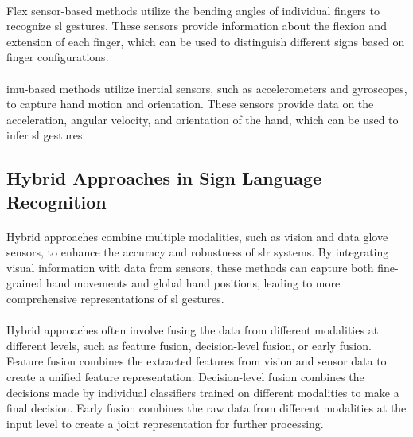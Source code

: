 \paragraph{}
Flex sensor-based methods utilize the bending angles of individual fingers to recognize \ac{sl} gestures. These sensors provide information about the flexion and extension of each finger, which can be used to distinguish different signs based on finger configurations.
\paragraph{}
\ac{imu}-based methods utilize inertial sensors, such as accelerometers and gyroscopes, to capture hand motion and orientation. These sensors provide data on the acceleration, angular velocity, and orientation of the hand, which can be used to infer \ac{sl} gestures.
\subsection{Hybrid Approaches in Sign Language Recognition}
\paragraph{}
Hybrid approaches combine multiple modalities, such as vision and data glove sensors, to enhance the accuracy and robustness of \ac{slr} systems. By integrating visual information with data from sensors, these methods can capture both fine-grained hand movements and global hand positions, leading to more comprehensive representations of \ac{sl} gestures.
\paragraph{}
Hybrid approaches often involve fusing the data from different modalities at different levels, such as feature fusion, decision-level fusion, or early fusion. Feature fusion combines the extracted features from vision and sensor data to create a unified feature representation. Decision-level fusion combines the decisions made by individual classifiers trained on different modalities to make a final decision. Early fusion combines the raw data from different modalities at the input level to create a joint representation for further processing.